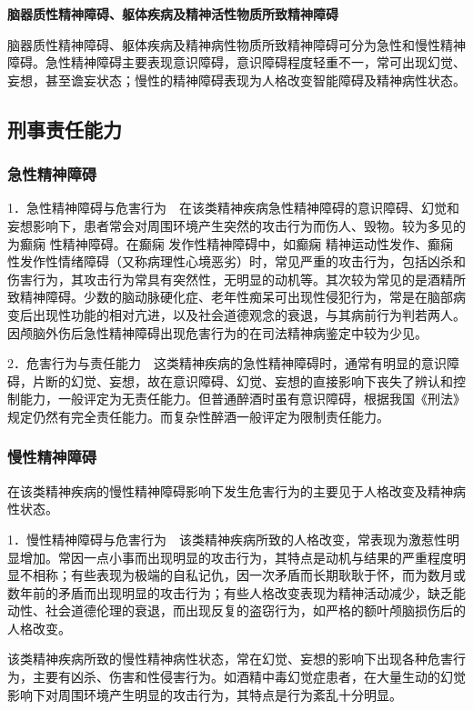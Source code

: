 \textbf{脑器质性精神障碍、躯体疾病及精神活性物质所致精神障碍}

脑器质性精神障碍、躯体疾病及精神病性物质所致精神障碍可分为急性和慢性精神障碍。急性精神障碍主要表现意识障碍，意识障碍程度轻重不一，常可出现幻觉、妄想，甚至谵妄状态；慢性的精神障碍表现为人格改变智能障碍及精神病性状态。

\subsection{刑事责任能力}

\subsubsection{急性精神障碍}

1．急性精神障碍与危害行为　在该类精神疾病急性精神障碍的意识障碍、幻觉和妄想影响下，患者常会对周围环境产生突然的攻击行为而伤人、毁物。较为多见的为癫痫
性精神障碍。在癫痫
发作性精神障碍中，如癫痫
精神运动性发作、癫痫
性发作性情绪障碍（又称病理性心境恶劣）时，常见严重的攻击行为，包括凶杀和伤害行为，其攻击行为常具有突然性，无明显的动机等。其次较为常见的是酒精所致精神障碍。少数的脑动脉硬化症、老年性痴呆可出现性侵犯行为，常是在脑部病变后出现性功能的相对亢进，以及社会道德观念的衰退，与其病前行为判若两人。因颅脑外伤后急性精神障碍出现危害行为的在司法精神病鉴定中较为少见。

2．危害行为与责任能力　这类精神疾病的急性精神障碍时，通常有明显的意识障碍，片断的幻觉、妄想，故在意识障碍、幻觉、妄想的直接影响下丧失了辨认和控制能力，一般评定为无责任能力。但普通醉酒时虽有意识障碍，根据我国《刑法》规定仍然有完全责任能力。而复杂性醉酒一般评定为限制责任能力。

\subsubsection{慢性精神障碍}

在该类精神疾病的慢性精神障碍影响下发生危害行为的主要见于人格改变及精神病性状态。

1．慢性精神障碍与危害行为　该类精神疾病所致的人格改变，常表现为激惹性明显增加。常因一点小事而出现明显的攻击行为，其特点是动机与结果的严重程度明显不相称；有些表现为极端的自私记仇，因一次矛盾而长期耿耿于怀，而为数月或数年前的矛盾而出现明显的攻击行为；有些人格改变表现为精神活动减少，缺乏能动性、社会道德伦理的衰退，而出现反复的盗窃行为，如严格的额叶颅脑损伤后的人格改变。

该类精神疾病所致的慢性精神病性状态，常在幻觉、妄想的影响下出现各种危害行为，主要有凶杀、伤害和性侵害行为。如酒精中毒幻觉症患者，在大量生动的幻觉影响下对周围环境产生明显的攻击行为，其特点是行为紊乱十分明显。

